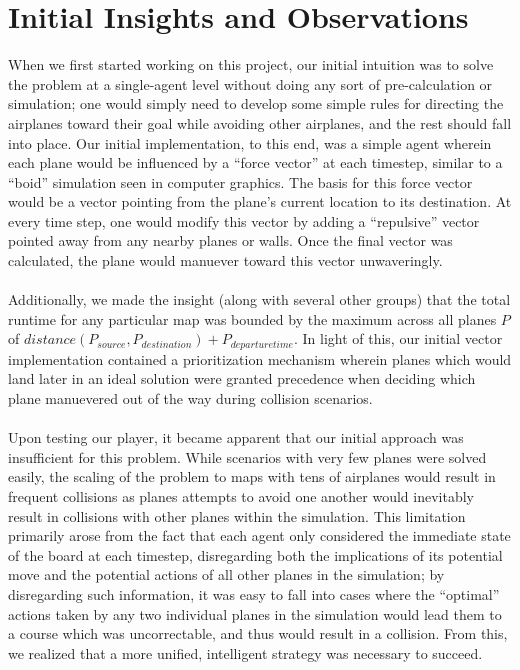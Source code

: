 \documentclass[10pt]{article}
\begin{document}
\section{Initial Insights and Observations}
When we first started working on this project, our initial intuition was to solve the problem 
at a single-agent level without doing any sort of pre-calculation or simulation; one would 
simply need to develop some simple rules for directing the airplanes toward their goal while
avoiding other airplanes, and the rest should fall into place. Our initial implementation, to
this end, was a simple agent wherein each plane would be influenced by a ``force vector'' at each
timestep, similar to a ``boid'' simulation seen in computer graphics. The basis for this force
vector would be a vector pointing from the plane's current location to its destination. At every
time step, one would modify this vector by adding a ``repulsive'' vector pointed away from any
nearby planes or walls. Once the final vector was calculated, the plane would manuever toward
this vector unwaveringly. \\\\
Additionally, we made the insight (along with several other groups) that the total runtime for
any particular map was bounded by the maximum across all planes $P$ of $distance(P_{source}, 
P_{destination}) + P_{departure time}$. In light of this, our initial vector implementation 
contained a prioritization mechanism wherein planes which would land later in an ideal solution
were granted precedence when deciding which plane manuevered out of the way during collision 
scenarios.\\\\
Upon testing our player, it became apparent that our initial approach was insufficient for this
problem. While scenarios with very few planes were solved easily, the scaling of the problem to
maps with tens of airplanes would result in frequent collisions as planes attempts to avoid one
another would inevitably result in collisions with other planes within the simulation. This 
limitation primarily arose from the fact that each agent only considered the immediate state
of the board at each timestep, disregarding both the implications of its potential move and
the potential actions of all other planes in the simulation; by disregarding such information,
it was easy to fall into cases where the ``optimal'' actions taken by any two individual planes 
in the simulation would lead them to a course which was uncorrectable, and thus would result in
a collision. From this, we realized that a more unified, intelligent strategy was necessary to
succeed.
\end{document}
